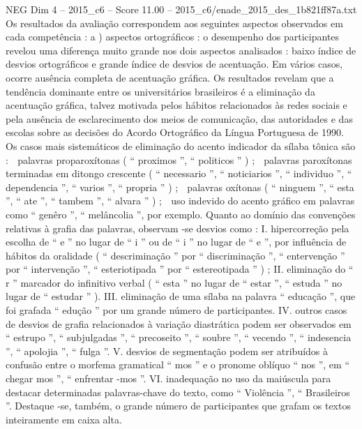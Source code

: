 \begin{textsample}{NEG Dim 4 – 2015\_c6 – Score 11.00 – 2015\_c6/enade\_2015\_des\_1b821ff87a.txt}
Os resultados da avaliação correspondem aos seguintes aspectos observados em cada competência : a ) aspectos ortográficos : o desempenho dos participantes revelou uma diferença muito grande nos dois aspectos analisados : baixo índice de desvios ortográficos e grande índice de desvios de acentuação.
Em vários casos, ocorre ausência completa de acentuação gráfica.
Os resultados revelam que a tendência dominante entre os universitários brasileiros é a eliminação da acentuação gráfica, talvez motivada pelos hábitos relacionados às redes sociais e pela ausência de esclarecimento dos meios de comunicação, das autoridades e das escolas sobre as decisões do Acordo Ortográfico da Língua Portuguesa de 1990.
Os casos mais sistemáticos de eliminação do acento indicador da sílaba tônica são :  palavras proparoxítonas ( “ proximos ”, “ politicos ” ) ;  palavras paroxítonas terminadas em ditongo crescente ( “ necessario ”, “ noticiarios ”, “ individuo ”, “ dependencia ”, “ varios ”, “ propria ” ) ;  palavras oxítonas ( “ ninguem ”, “ esta ”, “ ate ”, “ tambem ”, “ alvara ” ) ;  uso indevido do acento gráfico em palavras como “ genêro ”, “ melâncolia ”, por exemplo.
Quanto ao domínio das convenções relativas à grafia das palavras, observam -se desvios como : I. hipercorreção pela escolha de “ e ” no lugar de “ i ” ou de “ i ” no lugar de “ e ”, por influência de hábitos da oralidade ( “ descriminação ” por “ discriminação ”, “ entervenção ” por “ intervenção ”, “ esteriotipada ” por “ estereotipada ” ) ; II. eliminação do “ r ” marcador do infinitivo verbal ( “ esta ” no lugar de “ estar ”, “ estuda ” no lugar de “ estudar ” ).
III. eliminação de uma sílaba na palavra “ educação ”, que foi grafada “ edução ” por um grande número de participantes.
IV. outros casos de desvios de grafia relacionados à variação diastrática podem ser observados em “ estrupo ”, “ subjulgadas ”, “ precoseito ”, “ soubre ”, “ vecendo ”, “ indesencia ”, “ apolojia ”, “ fulga ”.
V. desvios de segmentação podem ser atribuídos à confusão entre o morfema gramatical “ mos ” e o pronome oblíquo “ nos ”, em “ chegar mos ”, “ enfrentar -mos ”.
VI. inadequação no uso da maiúscula para destacar determinadas palavras-chave do texto, como “ Violência ”, “ Brasileiros ”.
Destaque -se, também, o grande número de participantes que grafam os textos inteiramente em caixa alta.

\end{textsample}

